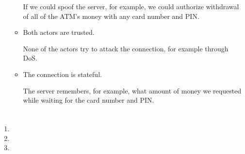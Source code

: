\documentclass[12pt, a4paper]{article}
\begin{document}
\begin{enumerate}[a]
\begin{itemize}
		If we could spoof the server, for example, we could authorize withdrawal of all of the ATM's money with any card number and PIN.
		\item Both actors are trusted.

		None of the actors try to attack the connection, for example through DoS.
		\item The connection is stateful.

		The server remembers, for example, what amount of money we requested while waiting for the card number and PIN.
	\end{itemize}
\end{enumerate}

\section{} %
\begin{enumerate}[a]
	\item %
	\item %
	\item %
\end{enumerate}
\end{document}
